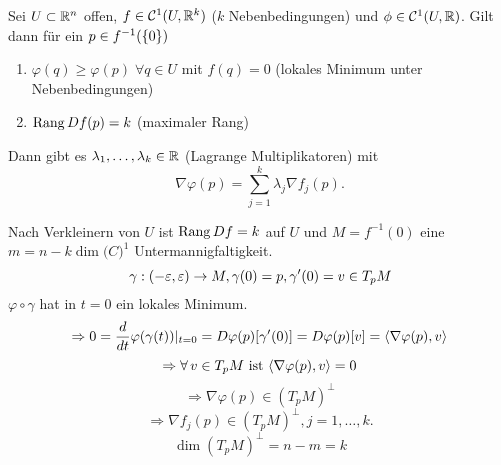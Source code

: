 \documentclass[../ana2.tex]{subfiles}
\begin{document}
\begin{satz}
    Sei \( U \subset \mathbb{R}^n \) offen, \( f \in \mathcal{C}^1(U, \mathbb{R}^k) \) 
    (\(k\) Nebenbedingungen) und \(\phi \in \mathcal{C}^1(U, \mathbb{R})\).
    Gilt dann für ein \(p \in f^{-1}(\{0\})\)
    \begin{enumerate}
        \item \( \varphi(q) \geq \varphi(p) \;\forall q \in U \) mit
        \( f(q) = 0 \) (lokales Minimum unter Nebenbedingungen)
        \item \( \operatorname{Rang} Df (p) = k \) (maximaler Rang)
    \end{enumerate}
    Dann gibt es \( \lambda_1, \ldots, \lambda_k \in \mathbb{R} \) (Lagrange Multiplikatoren)
    mit 
    \[ \nabla \varphi(p) = \sum_{j=1}^k \lambda_j \nabla f_j(p). \]
\end{satz}
\begin{bew}
    Nach Verkleinern von \(U\) ist \(\operatorname{Rang} Df = k \) 
    auf \(U\) und \(M = f^{-1}(0)\) eine
    \(m=n-k \dim \mathcal(C)^1\) Untermannigfaltigkeit.
    \[ \gamma:(-\varepsilon, \varepsilon)\rightarrow M, \gamma(0) = p, \gamma'(0) = v \in T_pM \]
    \( \varphi \circ \gamma \) hat in \( t = 0 \) ein lokales Minimum.
    \[ \Rightarrow 0 = \frac{d}{dt} \varphi(\gamma(t)) \vert_{t=0} 
    = D\varphi(p) [\gamma'(0)] = D\varphi(p)[v] 
    = \langle \nabla \varphi(p), v \rangle \]
    \[ \Rightarrow \forall v \in T_pM \text{ ist } 
    \scalarprod{\nabla \varphi(p)}{v} = 0 \]
    \[ \Rightarrow \nabla \varphi(p) \in (T_pM)^\bot \]    
    \[ \Rightarrow \nabla f_j(p) \in (T_p M)^\bot, j = 1,\ldots,k. \]
    \[ \dim(T_pM)^\bot = n-m = k \]
\end{bew}
\end{document}
